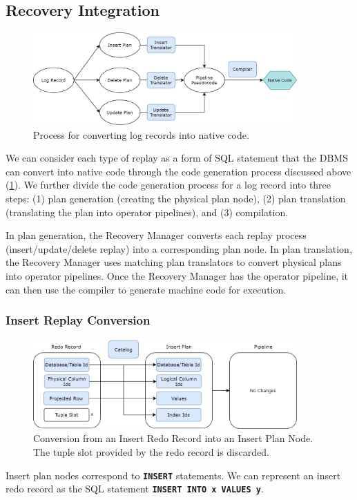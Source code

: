 \documentclass[12pt]{cmuthesis}
\newcommand{\dbSQL}[1]{\texttt{\textbf{#1}}\xspace}
\begin{document}
\subsection{Recovery Integration}
\begin{figure}[t!]
\centering
\includegraphics[width=0.9\textwidth]{images/ExpressionGeneration.png}
\caption{Process for converting log records into native code.}
\label{fig:expression_generation}
\end{figure}
We can consider each type of replay as a form of SQL statement that the DBMS can convert into native code through the code generation process discussed above (\cref{fig:expression_generation}). We further divide the code generation process for a log record into three steps: (1) plan generation (creating the physical plan node), (2) plan translation (translating the plan into operator pipelines), and (3) compilation.

In plan generation, the Recovery Manager converts each replay process (insert/update/delete replay) into a corresponding plan node. In plan translation, the Recovery Manager uses matching plan translators to convert physical plans into operator pipelines. Once the Recovery Manager has the operator pipeline, it can then use the compiler to generate machine code for execution.

\subsubsection{Insert Replay Conversion}
\label{insert_replay_conversion}

\begin{figure}[t!]
\centering
\includegraphics[width=0.9\textwidth]{images/InsertConversion.png}
\caption{Conversion from an Insert Redo Record into an Insert Plan Node. The tuple slot provided by the redo record is discarded.}
\label{fig:insert_conversion}
\end{figure}
Insert plan nodes correspond to \dbSQL{INSERT} statements. We can represent an insert redo record as the SQL statement \dbSQL{INSERT INTO x VALUES y}.
\end{document}
